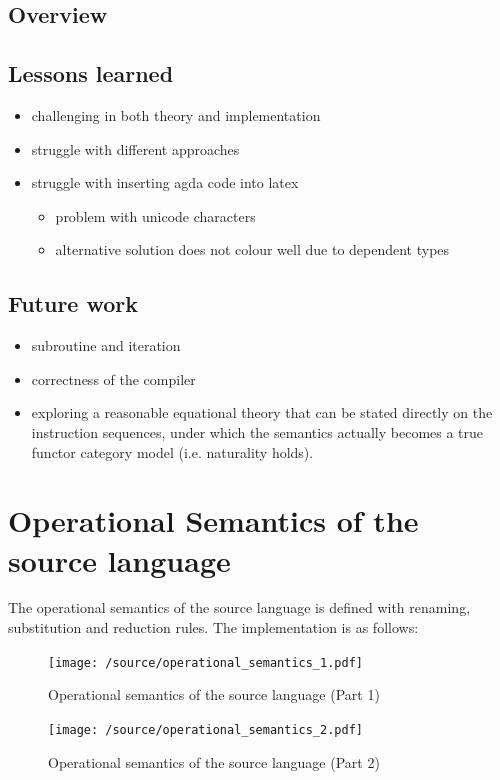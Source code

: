 \documentclass[12pt,twoside,a4paper]{report}
\theoremstyle{definition}
\theoremstyle{definition}
\theoremstyle{definition}
\theoremstyle{definition}
\begin{document}
    \section{Overview}

    \section{Lessons learned}
    \begin{itemize}
        \item 
        challenging in both theory and implementation

        \item
        struggle with different approaches
        \item
        struggle with inserting agda code into latex
        \begin{itemize}
            \item 
                problem with unicode characters
            \item 
                alternative solution does not colour well due to dependent types
        \end{itemize}
    \end{itemize}

    \section{Future work}
    \begin{itemize}
        \item subroutine and iteration
        \item correctness of the compiler
        \item exploring a reasonable equational theory that can be stated directly on the instruction sequences, under which the semantics actually becomes a true functor category model (i.e. naturality holds).
    \end{itemize}
\printbibliography

\appendix

\chapter{Operational Semantics of the source language} \label{app: operational_semantics}
    \minitoc
    The operational semantics of the source language is defined with renaming, substitution and reduction rules. The implementation is as follows:
    \begin{figure}[H]
        \centering
        \texttt{[image: /source/operational\_semantics\_1.pdf]}
        \caption{Operational semantics of the source language (Part 1)}
        \label{fig: operational_semantics_1}
    \end{figure}
    \begin{figure}[H]
        \centering
        \texttt{[image: /source/operational\_semantics\_2.pdf]}
        \caption{Operational semantics of the source language (Part 2)}
        \label{fig: operational_semantics_2}
    \end{figure}


\cleardoublepage
\let\cleardoublepage\clearpage
\pagestyle{empty}

\AtBeginShipoutNext{\AtBeginShipoutDiscard}
\end{document}
